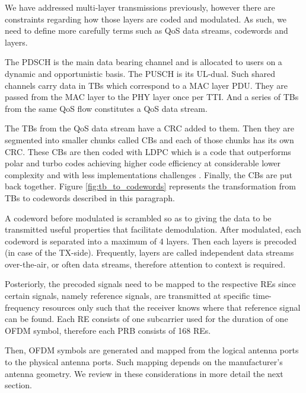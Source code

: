 We have addressed multi-layer transmissions previously, however there are constraints regarding how those layers are coded and modulated. As such, we need to define more carefully terms such as \ac{QoS} data streams, codewords and layers.

The \ac{PDSCH} is the main data bearing channel and is allocated to users on a dynamic and opportunistic basis. The \ac{PUSCH} is its \ac{UL}-dual. Such shared channels carry data in \acp{TB} which correspond to a \ac{MAC} layer \ac{PDU}. They are passed from the \ac{MAC} layer to the \ac{PHY} layer once per \ac{TTI}. And a series of \acp{TB} from the same \ac{QoS} flow constitutes a \ac{QoS} data stream. 

The \acp{TB} from the \ac{QoS} data stream have a \ac{CRC} added to them. Then they are segmented into smaller chunks called \acp{CB} and each of those chunks has its own \ac{CRC}. These \acp{CB} are then coded with \ac{LDPC} which is a code that outperforms polar and turbo codes achieving higher code efficiency at considerable lower complexity and with less implementations challenges \cite{qualcomm_innovative_five}. Finally, the \acp{CB} are put back together. Figure \ref{fig:tb_to_codewords} represents the transformation from \acp{TB} to codewords described in this paragraph.


A codeword before modulated is scrambled so as to giving the data to be transmitted useful properties that facilitate demodulation. After modulated, each codeword is separated into a maximum of 4 layers. Then each layers is precoded (in case of the \ac{TX}-side). Frequently, layers are called independent data streams over-the-air, or often data streams, therefore attention to context is required.

Posteriorly, the precoded signals need to be mapped to the respective \acp{RE} since certain signals, namely reference signals, are transmitted at specific time-frequency resources only such that the receiver knows where that reference signal can be found. Each \ac{RE} consists of one subcarrier used for the duration of one \ac{OFDM} symbol, therefore each PRB consists of 168 \acp{RE}.

Then, \ac{OFDM} symbols are generated and mapped from the logical antenna ports to the physical antenna ports. Such mapping depends on the manufacturer's antenna geometry. We review in these considerations in more detail the next section.


